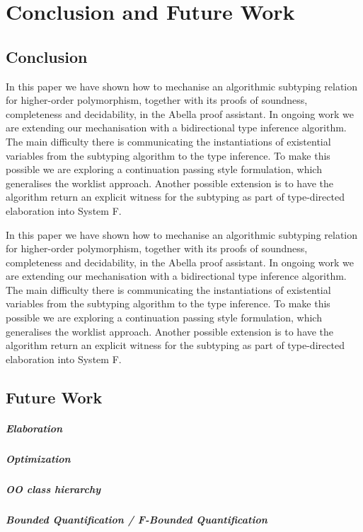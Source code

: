 \chapter{Conclusion and Future Work}
\label{chap:conclusion}


\section{Conclusion}

In this paper we have shown how to mechanise an algorithmic subtyping relation
for higher-order polymorphism, together with its proofs of soundness,
completeness and decidability, in the Abella proof assistant. 
In ongoing work we are extending our mechanisation with a bidirectional type
inference algorithm. The main difficulty there is communicating the
instantiations of existential variables from the subtyping algorithm to the
type inference. To make this possible we are exploring a continuation passing
style formulation, which generalises the worklist approach.
Another possible extension is to have the algorithm return an explicit witness
for the subtyping as part of type-directed elaboration into System F.


In this paper we have shown how to mechanise an algorithmic subtyping relation
for higher-order polymorphism, together with its proofs of soundness,
completeness and decidability, in the Abella proof assistant. 
In ongoing work we are extending our mechanisation with a bidirectional type
inference algorithm. The main difficulty there is communicating the
instantiations of existential variables from the subtyping algorithm to the
type inference. To make this possible we are exploring a continuation passing
style formulation, which generalises the worklist approach.
Another possible extension is to have the algorithm return an explicit witness
for the subtyping as part of type-directed elaboration into System F.




\section{Future Work}


\paragraph{Elaboration}

\paragraph{Optimization}

\paragraph{OO class hierarchy}

\paragraph{Bounded Quantification / F-Bounded Quantification}

